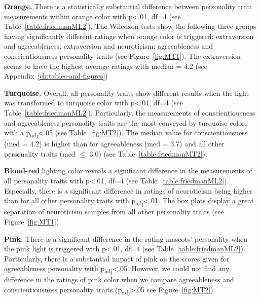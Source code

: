 \par\textbf{Orange.}
There is a statistically substantial difference between personality trait measurements within
orange color with p<.01, df=4 (see Table~\ref{table:friedmanML2}).
The Wilcoxon tests show the following three groups having significantly different ratings when orange
color is triggered: extraversion and agreeableness;
extraversion and neuroticism;
agreeableness and conscientiousness personality traits (see Figure~\ref{fig:MT1}).
The extraversion seems to have the highest average ratings with median = 4.2 (see Appendix~\ref{ch:tables-and-figures})

\par\textbf{Turquoise.}
Overall, all personality traits show different results when the light was transformed to turquoise color
with p<.01, df=4 (see Table~\ref{table:friedmanML2}).
Particularly, the measurements of conscientiousness and agreeableness personality traits are the most
conveyed by turquoise colors with a p\textsubscript{adj}<.05 (see Table~\ref{fig:MT2}).
The median value for conscientiousness (med = 4.2) is higher than for agreeableness
(med = 3.7) and all other personality traits (med $\leq$ 3.0) (see Table~\ref{table:friedmanMT2}).

\par\textbf{Blood-red}
lighting color reveals a significant difference in the measurements of all personality traits
with p<.01, df=4 (see Table~\ref{table:friedmanML2}).
Especially, there is a significant difference in ratings of neuroticism
being higher than for all other personality traits with p\textsubscript{adj}<.01.
The box plots display a great separation of neuroticism samples from all
other personality traits (see Figure~\ref{fig:MT1}).


\par\textbf{Pink.}
There is a significant difference in the rating mascots' personality when the pink light is
triggered with p<.01, df=4 (see Table~\ref{table:friedmanML2}).
Particularly, there is a substantial impact of pink on the scores given
for agreeableness personality with p\textsubscript{adj}<.05.
However, we could not find any difference in the ratings of pink color when
we compare agreeableness and conscientiousness personality traits
(p\textsubscript{adj}>.05 see Figure~\ref{fig:MT2}).



